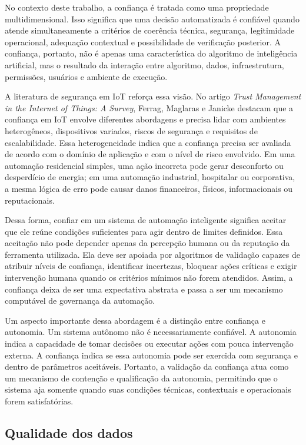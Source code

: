\documentclass[12pt]{article}
\begin{document}
No contexto deste trabalho, a confiança é tratada como uma propriedade multidimensional. Isso significa que uma decisão automatizada é confiável quando atende simultaneamente a critérios de coerência técnica, segurança, legitimidade operacional, adequação contextual e possibilidade de verificação posterior. A confiança, portanto, não é apenas uma característica do algoritmo de inteligência artificial, mas o resultado da interação entre algoritmo, dados, infraestrutura, permissões, usuários e ambiente de execução.

A literatura de segurança em IoT reforça essa visão. No artigo \textit{Trust Management in the Internet of Things: A Survey}, Ferrag, Maglaras e Janicke \cite{ferrag2019} destacam que a confiança em IoT envolve diferentes abordagens e precisa lidar com ambientes heterogêneos, dispositivos variados, riscos de segurança e requisitos de escalabilidade. Essa heterogeneidade indica que a confiança precisa ser avaliada de acordo com o domínio de aplicação e com o nível de risco envolvido. Em uma automação residencial simples, uma ação incorreta pode gerar desconforto ou desperdício de energia; em uma automação industrial, hospitalar ou corporativa, a mesma lógica de erro pode causar danos financeiros, físicos, informacionais ou reputacionais.

Dessa forma, confiar em um sistema de automação inteligente significa aceitar que ele reúne condições suficientes para agir dentro de limites definidos. Essa aceitação não pode depender apenas da percepção humana ou da reputação da ferramenta utilizada. Ela deve ser apoiada por algoritmos de validação capazes de atribuir níveis de confiança, identificar incertezas, bloquear ações críticas e exigir intervenção humana quando os critérios mínimos não forem atendidos. Assim, a confiança deixa de ser uma expectativa abstrata e passa a ser um mecanismo computável de governança da automação.

Um aspecto importante dessa abordagem é a distinção entre confiança e autonomia. Um sistema autônomo não é necessariamente confiável. A autonomia indica a capacidade de tomar decisões ou executar ações com pouca intervenção externa. A confiança indica se essa autonomia pode ser exercida com segurança e dentro de parâmetros aceitáveis. Portanto, a validação da confiança atua como um mecanismo de contenção e qualificação da autonomia, permitindo que o sistema aja somente quando suas condições técnicas, contextuais e operacionais forem satisfatórias.

\subsection{Qualidade dos dados}
\end{document}
